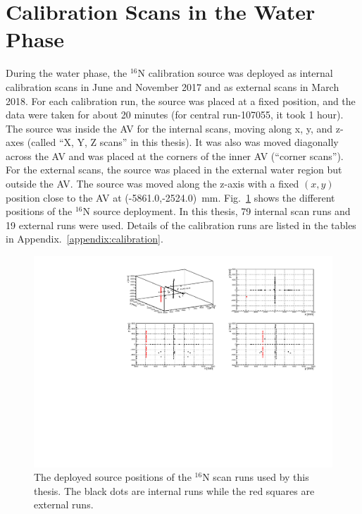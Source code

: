\section{ Calibration Scans in the Water Phase}\label{sect:n16_water}
During the water phase, the $^{16}$N calibration source was deployed as internal calibration scans in June and November 2017 and as external scans in March 2018. For each calibration run, the source was placed at a fixed position, and the data were taken for about 20 minutes (for central run-107055, it took 1 hour). The source was inside the AV for the internal scans, moving along x, y, and z-axes (called ``X, Y, Z scans'' in this thesis). It was also was moved diagonally across the AV and was placed at the corners of the inner AV (``corner scans''). For the external scans, the source was placed in the external water region but outside the AV. The source was moved along the z-axis with a fixed $(x,y)$ position close to the AV at (-5861.0,-2524.0)~mm. Fig.~\ref{N16_3Dscan} shows the different positions of the $^{16}$N source deployment. In this thesis, 79 internal scan runs and 19 external runs were used. Details of the calibration runs are listed in the tables in Appendix.~\ref{appendix:calibration}. 

\begin{figure}[!htb]
	\centering
	\includegraphics[width=15cm]{N16_3Dscan.pdf}
	\caption[The deployed source positions of the $^{16}$N scan runs.]{The deployed source positions of the $^{16}$N scan runs used by this thesis. The black dots are internal runs while the red squares are external runs.}
	\label{N16_3Dscan}
\end{figure}

